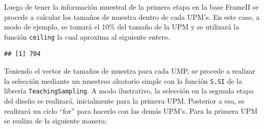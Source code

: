 \documentclass[
  spanish,
  12pt,
]{book}
\newenvironment{Shaded}{\begin{snugshade}}{\end{snugshade}}
\newcommand{\AttributeTok}[1]{\textcolor[rgb]{0.13,0.29,0.53}{#1}}
\newcommand{\FloatTok}[1]{\textcolor[rgb]{0.00,0.00,0.81}{#1}}
\newcommand{\FunctionTok}[1]{\textcolor[rgb]{0.13,0.29,0.53}{\textbf{#1}}}
\newcommand{\NormalTok}[1]{#1}
\newcommand{\OtherTok}[1]{\textcolor[rgb]{0.56,0.35,0.01}{#1}}
\newcommand{\SpecialCharTok}[1]{\textcolor[rgb]{0.81,0.36,0.00}{\textbf{#1}}}
\begin{document}
Luego de tener la información muestral de la primera etapa en la base FrameII se procede a calcular los tamaños de muestra dentro de cada UPM's. En este caso, a modo de ejemplo, se tomará el 10\% del tamaño de la UPM y se utilizará la función \texttt{ceiling} la cual aproxima al siguiente entero.

\begin{Shaded}
\end{Shaded}

\begin{verbatim}
## [1] 704
\end{verbatim}

Teniendo el vector de tamaños de muestra para cada UMP, se procede a realizar la selección mediante un muestreo aleatorio simple con la función \texttt{S.SI} de la librería \texttt{TeachingSampling}. A modo ilustrativo, la selección en la segunda etapa del diseño se realizará, inicialmente para la primera UPM. Posterior a eso, se realizará un ciclo ``for'' para hacerlo con las demás UPM's. Para la primera UPM se realiza de la siguiente manera:
\end{document}
